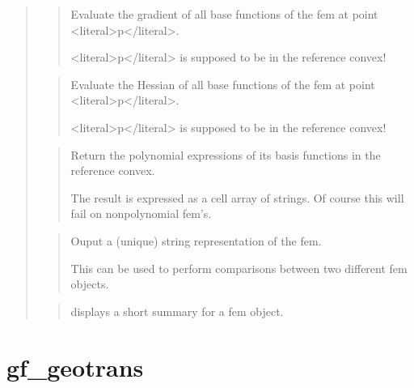 \documentclass[a4paper,11pt,english]{sphinxmanual}
\begin{document}
\begin{quote}
\begin{quote}
\sphinxAtStartPar
Evaluate the gradient of all base functions of the fem at point \textless{}literal\textgreater{}p\textless{}/literal\textgreater{}.

\sphinxAtStartPar
\textless{}literal\textgreater{}p\textless{}/literal\textgreater{} is supposed to be in the reference convex!
\end{quote}

\sphinxAtStartPar
{}
\begin{quote}

\sphinxAtStartPar
Evaluate the Hessian of all base functions of the fem at point \textless{}literal\textgreater{}p\textless{}/literal\textgreater{}.

\sphinxAtStartPar
\textless{}literal\textgreater{}p\textless{}/literal\textgreater{} is supposed to be in the reference convex!
\end{quote}

\sphinxAtStartPar
{}
\begin{quote}

\sphinxAtStartPar
Return the polynomial expressions of its basis functions in
the reference convex.

\sphinxAtStartPar
The result is expressed as a cell array of
strings. Of course this will fail on non\sphinxhyphen{}polynomial fem’s.
\end{quote}

\sphinxAtStartPar
{}
\begin{quote}

\sphinxAtStartPar
Ouput a (unique) string representation of the fem.

\sphinxAtStartPar
This can be used to perform comparisons between two different fem
objects.
\end{quote}

\sphinxAtStartPar
{}
\begin{quote}

\sphinxAtStartPar
displays a short summary for a fem object.
\end{quote}
\end{quote}


\section{gf\_geotrans}
\label{\detokenize{scilab/cmdref_gf_geotrans:gf-geotrans}}\label{\detokenize{scilab/cmdref_gf_geotrans::doc}}
\sphinxAtStartPar
{}
\end{document}
